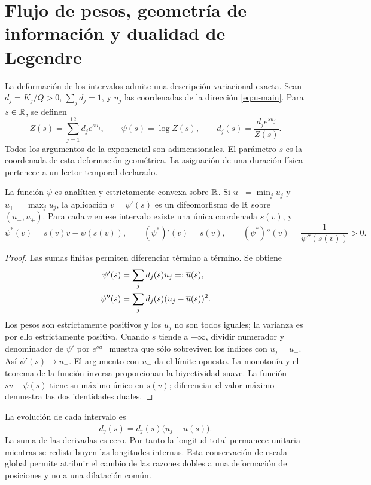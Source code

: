 \section{Flujo de pesos, geometría de información y dualidad de Legendre}
\label{sec:convex-refinement}

La deformación de los intervalos admite una descripción variacional
exacta. Sean \(d_j=K_j/Q>0\), \(\sum_jd_j=1\), y \(u_j\) las
coordenadas de la dirección \eqref{eq:u-main}. Para \(s\in\mathbb R\),
se definen
\begin{equation}
 Z(s)=\sum_{j=1}^{12}d_j e^{su_j},\qquad
 \psi(s)=\log Z(s),\qquad
 d_j(s)=\frac{d_j e^{su_j}}{Z(s)}.
 \label{eq:convex-partition}
\end{equation}
Todos los argumentos de la exponencial son adimensionales. El parámetro
\(s\) es la coordenada de esta deformación geométrica. La asignación de
una duración física pertenece a un lector temporal declarado.

\begin{theorem}
La función \(\psi\) es analítica y estrictamente convexa sobre \(\mathbb R\).
Si \(u_- =\min_j u_j\) y \(u_+=\max_j u_j\), la aplicación
\(v=\psi'(s)\) es un difeomorfismo de \(\mathbb R\) sobre \((u_-,u_+)\).
Para cada \(v\) en ese intervalo existe una única coordenada \(s(v)\), y
\[
 \psi^*(v)=s(v)v-\psi(s(v)),\qquad
 (\psi^*)'(v)=s(v),\qquad
 (\psi^*)''(v)=\frac1{\psi''(s(v))}>0.
\]
\end{theorem}
\begin{proof}
Las sumas finitas permiten diferenciar término a término. Se obtiene
\begin{align}
 \psi'(s)&=\sum_jd_j(s)u_j=:\overline u(s),\notag\\
 \psi''(s)&=\sum_jd_j(s)(u_j-\overline u(s))^2.
 \label{eq:variance}
\end{align}
Los pesos son estrictamente positivos y los \(u_j\) no son todos iguales;
la varianza es por ello estrictamente positiva. Cuando \(s\) tiende a
\(+\infty\), dividir numerador y denominador de \(\psi'\) por
\(e^{su_+}\) muestra que sólo sobreviven los índices con \(u_j=u_+\).
Así \(\psi'(s)\to u_+\). El argumento con \(u_-\) da el límite
opuesto. La monotonía y el teorema de la función inversa proporcionan la
biyectividad suave. La función \(sv-\psi(s)\) tiene su máximo único
en \(s(v)\); diferenciar el valor máximo demuestra las dos identidades
duales.
\end{proof}

La evolución de cada intervalo es
\begin{equation}
 \dot d_j(s)=d_j(s)\bigl(u_j-\overline u(s)\bigr).
 \label{eq:replicator}
\end{equation}
La suma de las derivadas es cero. Por tanto la longitud total permanece
unitaria mientras se redistribuyen las longitudes internas. Esta conservación
de escala global permite atribuir el cambio de las razones dobles a una
deformación de posiciones y no a una dilatación común.

